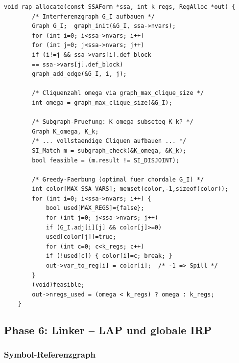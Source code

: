 ﻿\documentclass[a4paper,12pt]{article}
\theoremstyle{definition}
\begin{document}
\begin{lstlisting}[style=cstyle, caption={RAP -- Cliquen-SI und Greedy-Färbung
		(compiler\_full.c)}, label=lst:rap-impl]
	void rap_allocate(const SSAForm *ssa, int k_regs, RegAlloc *out) {
		/* Interferenzgraph G_I aufbauen */
		Graph G_I;  graph_init(&G_I, ssa->nvars);
		for (int i=0; i<ssa->nvars; i++)
		for (int j=0; j<ssa->nvars; j++)
		if (i!=j && ssa->vars[i].def_block
		== ssa->vars[j].def_block)
		graph_add_edge(&G_I, i, j);
		
		/* Cliquenzahl omega via graph_max_clique_size */
		int omega = graph_max_clique_size(&G_I);
		
		/* Subgraph-Pruefung: K_omega subseteq K_k? */
		Graph K_omega, K_k;
		/* ... vollstaendige Cliquen aufbauen ... */
		SI_Match m = subgraph_check(&K_omega, &K_k);
		bool feasible = (m.result != SI_DISJOINT);
		
		/* Greedy-Faerbung (optimal fuer chordale G_I) */
		int color[MAX_SSA_VARS]; memset(color,-1,sizeof(color));
		for (int i=0; i<ssa->nvars; i++) {
			bool used[MAX_REGS]={false};
			for (int j=0; j<ssa->nvars; j++)
			if (G_I.adj[i][j] && color[j]>=0)
			used[color[j]]=true;
			for (int c=0; c<k_regs; c++)
			if (!used[c]) { color[i]=c; break; }
			out->var_to_reg[i] = color[i];  /* -1 => Spill */
		}
		(void)feasible;
		out->nregs_used = (omega < k_regs) ? omega : k_regs;
	}
\end{lstlisting}

\subsection{Phase 6: Linker -- LAP und globale IRP}
\label{sec:impl-lap}

\subsubsection{Symbol-Referenzgraph}
\end{document}
